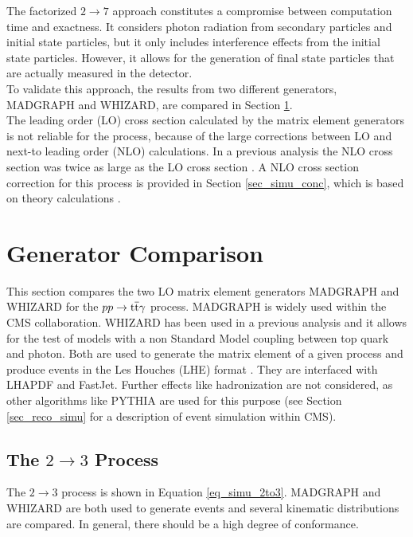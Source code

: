 The factorized $2 \to 7$ approach constitutes a compromise between computation time and exactness. It considers photon radiation from secondary particles and initial state particles, but it only includes interference effects from the initial state particles. However, it allows for the generation of final state particles that are actually measured in the detector.\\
To validate this approach, the results from two different generators, MADGRAPH and WHIZARD, are compared in Section \ref{ch_simu_comp}. \\
The leading order (LO) cross section calculated by the matrix element generators is not reliable for the \ttgamma process, because of the large corrections between LO and next-to leading order (NLO) calculations. In a previous analysis the NLO cross section was twice as large as the LO cross section \cite{CMS-PAS-TOP-13-011}. A NLO cross section correction for this process is provided in Section \ref{sec_simu_conc}, which is based on theory calculations \cite{Melnikov:2011ta}. \\ 

\section{Generator Comparison}
\label{ch_simu_comp}

This section compares the two LO matrix element generators MADGRAPH and WHIZARD for the $pp \to \mathrm{t}\overline{\mathrm{t}} \gamma$ process. MADGRAPH is widely used within the CMS collaboration. WHIZARD has been used in a previous \ttgamma analysis \cite{CMS-PAS-TOP-13-011} and it allows for the test of models with a non Standard Model coupling between top quark and photon. Both are used to generate the matrix element of a given process and produce events in the Les Houches (LHE) format \cite{Alwall:2006yp}. They are interfaced with LHAPDF \cite{Whalley:2005nh} and FastJet\cite{Cacciari:2011ma}. Further effects like hadronization are not considered, as other algorithms like PYTHIA are used for this purpose (see Section \ref{sec_reco_simu} for a description of event simulation within CMS).

\subsection{The $2 \to 3$ Process}

The $2 \to 3$ process is shown in Equation \ref{eq_simu_2to3}. MADGRAPH and WHIZARD are both used to generate events and several kinematic distributions are compared. In general, there should be a high degree of conformance.

